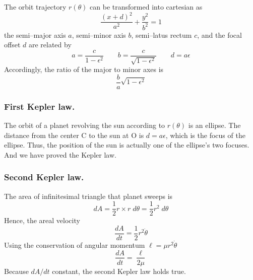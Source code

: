\documentclass[../../../main.tex]{subfiles}
\begin{document}
The orbit trajectory $r(\theta)$ can be transformed into cartesian as 
\begin{equation*}
    \frac{(x+d)^2}{a^2  }+\frac{y^2 }{b^2 }=1
\end{equation*}
the semi–major axis $a$, semi–minor axis $b$, semi–latus rectum $c$, and the focal offset $d$ are related by
\begin{equation*}
    a=\frac{c }{1-\epsilon^2 }\qquad
    b=\frac{c }{\sqrt{1-\epsilon^2}}\qquad
    d=a\epsilon
\end{equation*}
Accordingly, the ratio of the major to minor axes is
\begin{equation*}
    \frac{b }{a }\sqrt{1-\epsilon^2}
\end{equation*}

\subsubsection{First Kepler law.} 
The orbit of a planet revolving the sun according to $r(\theta)$ is an ellipse.
The distance from the center C to the sun at O is $d = a\epsilon$, which is the focus of the ellipse.
Thus, the position of the sun is actually one of the ellipse's two focuses.
And we have proved the Kepler law.

\subsubsection{Second Kepler law.}
The area of infinitesimal triangle that planet sweeps is
\begin{equation*}
    dA=\frac{1 }{2}r \times r\;d\theta=\frac{1 }{2}r^2\;d\theta
\end{equation*}
Hence, the areal velocity 
\begin{equation*}
    \frac{dA }{dt}=\frac{1 }{2 }r^2 \dot{\theta}
\end{equation*}
Using the conservation of angular momentum $\ell=\mu r^2 \dot{\theta}$
\begin{equation*}
    \frac{d A }{dt }=\frac{\ell }{2\mu}
\end{equation*}
Because $dA/dt$ constant, the second Kepler law holds true.
\end{document}
